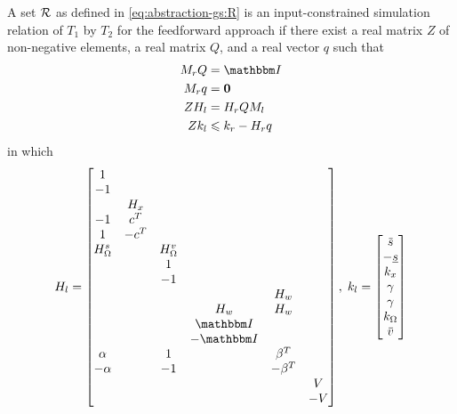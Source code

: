 \begin{theorem}
  \label{thm:abstraction-gs:sufficient-LP}
  A set $\mathcal{R}$ as defined in \eqref{eq:abstraction-gs:R} is an input-constrained simulation relation of $T_{1}$ by $T_{2}$ for the feedforward approach if there exist a real matrix $Z$ of non-negative elements, a real matrix $Q$, and a real vector $q$ such that
  \begin{subequations}
    \label{eq:abstraction-gs:sufficient-LP}
    \begin{align}
      M_{r} Q &= \IdentityMatrix \\
      M_{r} q &= \Zero \\
      Z H_{l} &= H_{r} Q M_{l} \\
      Z k_{l} &\leqslant k_{r} - H_{r} q
    \end{align}
  \end{subequations}
  in which
  \begin{gather*}
    H_{l} =
    \begin{bmatrix}
      1 \\ %
      -1 \\ %
        & H_{x} \\ %
      -1  & c^{T} \\ %
      1   & -c^{T} \\ %
      H_{\Omega}^{s} & & H_{\Omega}^{v} \\
      & & 1 \\
      & & -1 \\
      & & & & H_{w} \\
      & & & H_{w} & H_{w} \\
      & & & \IdentityMatrix \\
      & & & -\IdentityMatrix \\
      \alpha & & 1 & & \beta^{T} \\
      -\alpha & & -1 & & -\beta^{T} \\
      & & & & & V \\
      & & & & & -V
    \end{bmatrix}, \;
    k_{l} =
    \begin{bmatrix}
      \overbar{s} \\
      -\underline{s} \\
      k_{x} \\
      \gamma \\
      \gamma \\
      k_{\Omega} \\
      \overbar{v} \\

\end{bmatrix}
\end{gather*}
\end{theorem}
